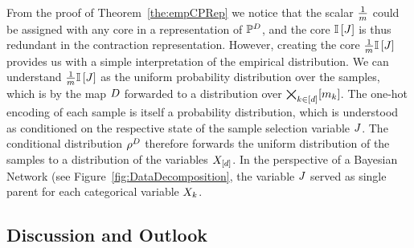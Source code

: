 From the proof of Theorem~\ref{the:empCPRep} we notice that the scalar $\frac{1}{m}$ could be assigned with any core in a representation of $\mathbb{P}^{D}$, and the core $\mathbb{I}\left[J\right]$ is thus redundant in the contraction representation.
However, creating the core $\frac{1}{m}\mathbb{I}\left[J\right]$ provides us with a simple interpretation of the empirical distribution.
We can understand $\frac{1}{m}\mathbb{I}\left[J\right]$ as the uniform probability distribution over the samples, which is by the map $D$ forwarded to a distribution over $\bigtimes_{k\in[d]}[m_{k}]$.
The one-hot encoding of each sample is itself a probability distribution, which is understood as conditioned on the respective state of the sample selection variable $J$.
The conditional distribution $\rho^{D}$ therefore forwards the uniform distribution of the samples to a distribution of the variables $X_{[d]}$.
In the perspective of a Bayesian Network (see Figure~\ref{fig:DataDecomposition}, the variable $J$ served as single parent for each categorical variable $X_{k}$.




\subsection{Discussion and Outlook}

